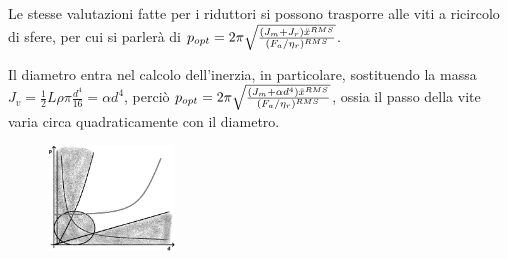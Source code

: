 Le stesse valutazioni fatte per i riduttori si possono trasporre alle viti a ricircolo di sfere, per cui si parlerà di \(p_{opt}=2\pi \sqrt{\frac{(J_m+J_r)\Ddot{x}^{RMS}}{(F_a/\eta_r)^{RMS}}}\).

Il diametro entra nel calcolo dell'inerzia, in particolare, sostituendo la massa \(J_v=\frac{1}{2}L\rho \pi \frac{d^4}{16} = \alpha d^4\), perciò \(p_{opt}=2\pi \sqrt{\frac{(J_m+\alpha d^4)\Ddot{x}^{RMS}}{(F_a/\eta_r)^{RMS}}}\), ossia il passo della vite varia circa quadraticamente con il diametro.

\begin{figure}[h]
    \centering
    \includegraphics[width=0.3\textwidth]{Immagini/passo_ottimo_libero.png}
\end{figure}